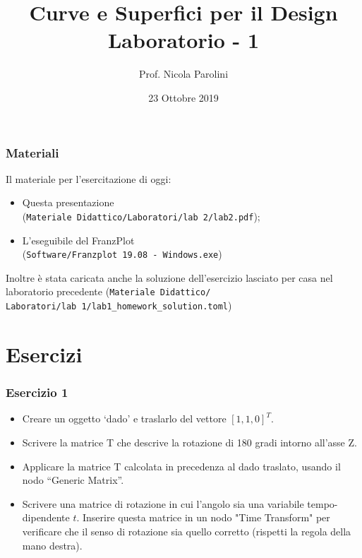 \documentclass{beamer}
\title[Curve e Sup. - Lab 1]{Curve e Superfici per il Design \\ Laboratorio - 1}
\author[Prof. Parolini]{Prof. Nicola Parolini}
\date{23 Ottobre 2019}
\newcommand{\frnzplt}{FranzPlot }
\begin{document}
\begin{frame}
\maketitle
\end{frame}

\begin{frame}
\frametitle{Materiali}
Il materiale per l'esercitazione di oggi:
\begin{itemize}
\item Questa presentazione \\ (\texttt{Materiale Didattico/Laboratori/lab 2/lab2.pdf});
\item L'eseguibile del \frnzplt \\ (\texttt{Software/Franzplot 19.08 - Windows.exe})
\end{itemize}
Inoltre \`e stata caricata anche la soluzione dell'esercizio lasciato per casa nel laboratorio precedente
    (\texttt{Materiale Didattico/ \\ Laboratori/lab 1/lab1\_homework\_solution.toml})
\end{frame}



\section{Esercizi}
%
\begin{frame}
\frametitle{Esercizio 1}
\begin{itemize}
    \item Creare un oggetto `dado' e traslarlo del vettore $[1, 1, 0]^T$.
    \item Scrivere la matrice T che descrive la rotazione di 180 gradi intorno all'asse Z.
    \item Applicare la matrice T calcolata in precedenza al dado traslato, usando il nodo
        ``Generic Matrix''.
    \item Scrivere una matrice di rotazione in cui l'angolo sia una variabile tempo-dipendente $t$. Inserire questa matrice in un nodo "Time Transform"
        per verificare che il senso di rotazione sia quello corretto (rispetti la regola della mano destra).
\end{itemize}
\end{frame}
\end{document}

